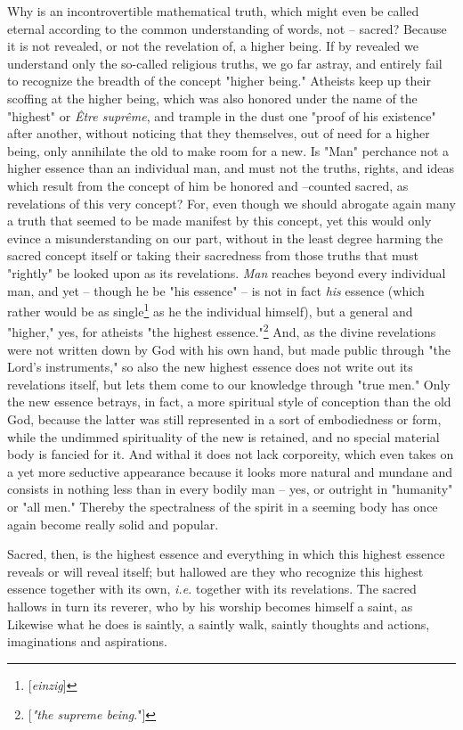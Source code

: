 Why is an incontrovertible mathematical truth, which might even be called 
eternal according to the common understanding of words, not -- sacred? Because 
it is not revealed, or not the revelation of, a higher being. If by revealed 
we understand only the so-called religious truths, we go far astray, and 
entirely fail to recognize the breadth of the concept "{}higher being."{} 
Atheists keep up their scoffing at the higher being, which was also honored 
under the name of the "{}highest"{} or \textit{\^Etre supr\^eme}, and trample 
in the dust one "{}proof of his existence"{} after another, without noticing 
that they themselves, out of need for a higher being, only annihilate the old 
to make room for a new. Is "{}Man"{} perchance not a higher essence than an 
individual man, and must not the truths, rights, and ideas which result from 
the concept of him be honored and --counted sacred, as revelations of this 
very concept? For, even though we should abrogate again many a truth that 
seemed to be made manifest by this concept, yet this would only evince a 
misunderstanding on our part, without in the least degree harming the sacred 
concept itself or taking their sacredness from those truths that must 
"{}rightly"{} be looked upon as its revelations. \textit{Man} reaches beyond 
every individual man, and yet -- though he be "{}his essence"{} -- is not in 
fact \textit{his} essence (which rather would be as 
single\footnote{[\textit{einzig}]} as he the individual himself), but a 
general and "{}higher,"{} yes, for atheists "{}the highest 
essence."{}\footnote{[\textit{"{}the supreme being}."{}]} And, as the divine 
revelations were not written down by God with his own hand, but made public 
through "{}the Lord's instruments,"{} so also the new highest essence does not 
write out its revelations itself, but lets them come to our knowledge through 
"{}true men."{} Only the new essence betrays, in fact, a more spiritual style 
of conception than the old God, because the latter was still represented in a 
sort of embodiedness or form, while the undimmed spirituality of the new is 
retained, and no special material body is fancied for it. And withal it does 
not lack corporeity, which even takes on a yet more seductive appearance 
because it looks more natural and mundane and consists in nothing less than in 
every bodily man -- yes, or outright in "{}humanity"{} or "{}all men."{} 
Thereby the spectralness of the spirit in a seeming body has once again become 
really solid and popular.

Sacred, then, is the highest essence and everything in which this highest 
essence reveals or will reveal itself; but hallowed are they who recognize 
this highest essence together with its own, \textit{i.e.} together with its 
revelations. The sacred hallows in turn its reverer, who by his worship 
becomes himself a saint, as Likewise what he does is saintly, a saintly walk, 
saintly thoughts and actions, imaginations and aspirations.

